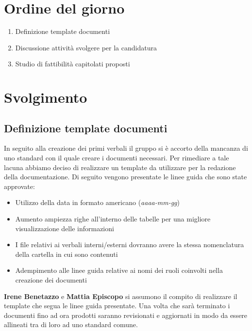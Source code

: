 \documentclass[12pt, a4paper,table]{article}
\begin{document}
	\section{Ordine del giorno}
	\begin{enumerate}
		\item Definizione template documenti
		\item Discussione attività svolgere per la candidatura
		\item Studio di fattibilità capitolati proposti
	\end{enumerate}
	\newpage
	
	\section{Svolgimento}
		\subsection {Definizione template documenti}
		In seguito alla creazione dei primi verbali il gruppo si è accorto della mancanza di uno standard con il quale creare i documenti necessari. Per rimediare a tale lacuna abbiamo deciso di realizzare un template da utilizzare per la redazione della documentazione. Di seguito vengono presentate le linee guida che sono state approvate: 
		\begin{itemize}
			\item Utilizzo della data in formato americano (\textit{aaaa-mm-gg})
			\item Aumento ampiezza righe all'interno delle tabelle per una migliore visualizzazione delle informazioni
			\item I file relativi ai verbali interni/esterni dovranno avere la stessa nomenclatura della cartella in cui sono contenuti
			\item Adempimento alle linee guida relative ai nomi dei ruoli coinvolti nella creazione dei documenti
		\end{itemize}
		\textbf{Irene Benetazzo} e \textbf{Mattia Episcopo} si assumono il compito di realizzare il template che segua le linee guida presentate. Una volta che sarà terminato i documenti fino ad ora prodotti saranno revisionati e aggiornati in modo da essere allineati tra di loro ad uno standard comune. 
		 
\end{document}

